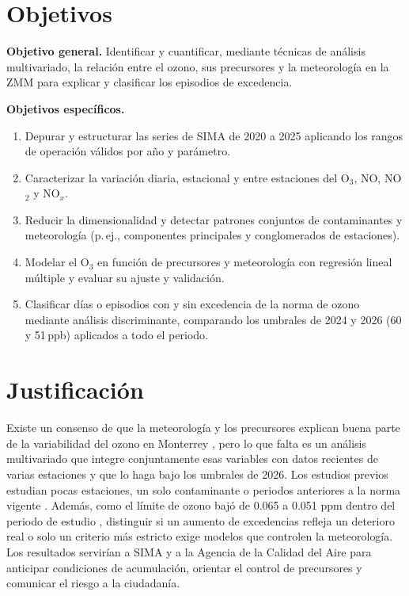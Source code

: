 \documentclass[11pt,letterpaper]{article}
\begin{document}
\section{Objetivos}
\textbf{Objetivo general.} Identificar y cuantificar, mediante t\'ecnicas de an\'alisis multivariado, la relaci\'on entre el ozono, sus precursores y la meteorolog\'ia en la ZMM para explicar y clasificar los episodios de excedencia.

\textbf{Objetivos espec\'ificos.}
\begin{enumerate}\itemsep0pt
\item Depurar y estructurar las series de SIMA de 2020 a 2025 aplicando los rangos de operaci\'on v\'alidos por a\~no y par\'ametro.
\item Caracterizar la variaci\'on diaria, estacional y entre estaciones del O$_3$, NO, NO$_2$ y NO$_x$.
\item Reducir la dimensionalidad y detectar patrones conjuntos de contaminantes y meteorolog\'ia (p.\,ej., componentes principales y conglomerados de estaciones).
\item Modelar el O$_3$ en funci\'on de precursores y meteorolog\'ia con regresi\'on lineal m\'ultiple y evaluar su ajuste y validaci\'on.
\item Clasificar d\'ias o episodios con y sin excedencia de la norma de ozono mediante an\'alisis discriminante, comparando los umbrales de 2024 y 2026 (60 y 51\,ppb) aplicados a todo el periodo.
\end{enumerate}

\section{Justificaci\'on}
Existe un consenso de que la meteorolog\'ia y los precursores explican buena parte de la variabilidad del ozono en Monterrey \cite{persistent2026,martinez_repo}, pero lo que falta es un an\'alisis multivariado que integre conjuntamente esas variables con datos recientes de varias estaciones y que lo haga bajo los umbrales de 2026. Los estudios previos estudian pocas estaciones, un solo contaminante o periodos anteriores a la norma vigente \cite{aguirre2022,cadereyta2025}. Adem\'as, como el l\'imite de ozono baj\'o de 0.065 a 0.051 ppm dentro del periodo de estudio \cite{sinaica}, distinguir si un aumento de excedencias refleja un deterioro real o solo un criterio m\'as estricto \cite{universal2025} exige modelos que controlen la meteorolog\'ia. Los resultados servir\'ian a SIMA y a la Agencia de la Calidad del Aire para anticipar condiciones de acumulaci\'on, orientar el control de precursores y comunicar el riesgo a la ciudadan\'ia.
\end{document}
